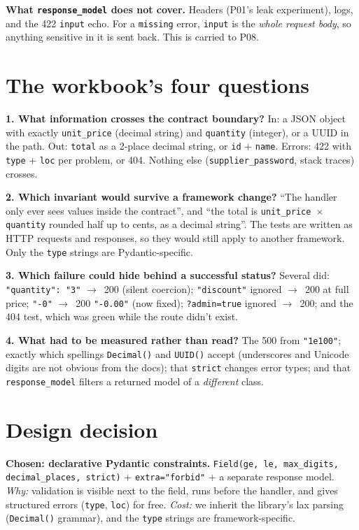 \documentclass[11pt,a4paper]{article}
\newcommand{\code}[1]{\texttt{#1}}
\newcommand{\ra}{$\rightarrow$}
\begin{document}
\textbf{What \code{response\_model} does not cover.} Headers (P01's leak experiment),
logs, and the 422 \code{input} echo. For a \code{missing} error, \code{input} is the
\emph{whole request body}, so anything sensitive in it is sent back. This is carried
to P08.

\section{The workbook's four questions}

\textbf{1. What information crosses the contract boundary?} In: a JSON object with
exactly \code{unit\_price} (decimal string) and \code{quantity} (integer), or a UUID in
the path. Out: \code{total} as a 2-place decimal string, or \code{id} + \code{name}.
Errors: 422 with \code{type} + \code{loc} per problem, or 404. Nothing else
(\code{supplier\_password}, stack traces) crosses.

\textbf{2. Which invariant would survive a framework change?} ``The handler only ever
sees values inside the contract'', and ``the total is \code{unit\_price $\times$ quantity}
rounded half up to cents, as a decimal string''. The tests are written as HTTP
requests and responses, so they would still apply to another framework. Only the
\code{type} strings are Pydantic-specific.

\textbf{3. Which failure could hide behind a successful status?} Several did:
\code{"quantity": "3"} \ra\ 200 (silent coercion); \code{"discount"} ignored \ra\ 200
at full price; \code{"-0"} \ra\ 200 \code{"-0.00"} (now fixed); \code{?admin=true} ignored
\ra\ 200; and the 404 test, which was green while the route didn't exist.

\textbf{4. What had to be measured rather than read?} The 500 from \code{"1e100"};
exactly which spellings \code{Decimal()} and \code{UUID()} accept (underscores and
Unicode digits are not obvious from the docs); that \code{strict} changes error types;
and that \code{response\_model} filters a returned model of a \emph{different} class.

\section{Design decision}

\textbf{Chosen: declarative Pydantic constraints.} \code{Field(ge, le, max\_digits,
decimal\_places, strict)} + \code{extra="forbid"} + a separate response model.
\emph{Why:} validation is visible next to the field, runs before the handler, and
gives structured errors (\code{type}, \code{loc}) for free. \emph{Cost:} we inherit
the library's lax parsing (\code{Decimal()} grammar), and the \code{type} strings are
framework-specific.
\end{document}
